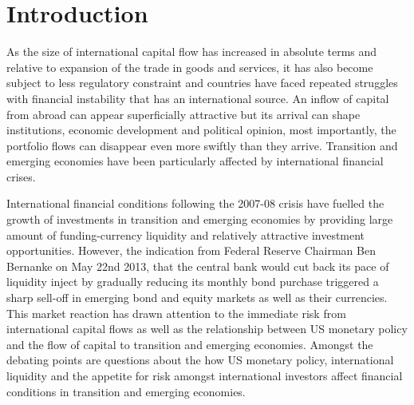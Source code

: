 \documentclass[12pt, a4paper, oneside]{article} %
\begin{document}
\section{Introduction}
As the size of international capital flow has increased in absolute terms and relative to expansion of the trade in goods and services, it has also become subject to less regulatory constraint and countries have faced repeated struggles with financial instability that has an international source.  An inflow of capital from abroad can appear superficially attractive but its arrival can shape institutions, economic development and political opinion, most importantly, the portfolio flows can disappear even more swiftly than they arrive.  Transition and emerging economies have been particularly affected by international financial crises.  %


International financial conditions following the 2007-08 crisis have fuelled the growth of investments in transition and emerging economies by providing large amount of funding-currency liquidity and relatively attractive investment opportunities. However, the indication from Federal Reserve Chairman Ben Bernanke on May 22nd 2013, that the central bank would cut back its pace of liquidity inject by gradually reducing its monthly bond purchase triggered a sharp sell-off in emerging bond and equity markets as well as their currencies.  This market reaction has drawn attention to the immediate risk from international capital flows  as well as the relationship between US monetary policy and the flow of capital to transition and emerging economies.  Amongst the debating points are questions about the how  US monetary policy, international liquidity and the appetite for risk amongst international investors affect financial conditions in transition and emerging economies.  
\end{document}
